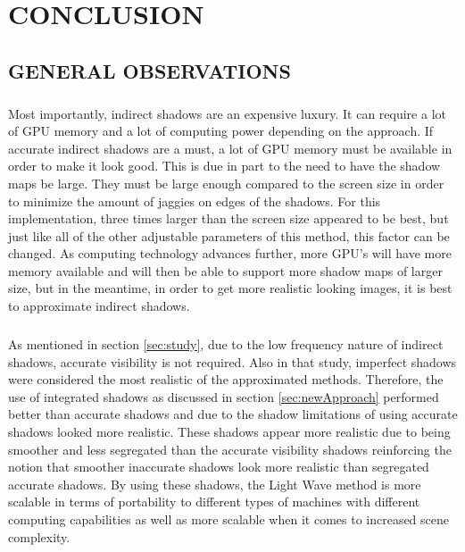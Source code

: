 \chapter{CONCLUSION}

\section{GENERAL OBSERVATIONS}
\paragraph{}
Most importantly, indirect shadows are an expensive luxury.  It can require a lot of GPU memory and a lot of computing power depending on the approach.  If accurate indirect shadows are a must, a lot of GPU memory must be available in order to make it look good.  This is due in part to the need to have the shadow maps be large.  They must be large enough compared to the screen size in order to minimize the amount of jaggies on edges of the shadows.  For this implementation, three times larger than the screen size appeared to be best, but just like all of the other adjustable parameters of this method, this factor can be changed.  As computing technology advances further, more GPU's will have more memory available and will then be able to support more shadow maps of larger size, but in the meantime, in order to get more realistic looking images, it is best to approximate indirect shadows.

\paragraph{}
As mentioned in section \ref{sec:study}, due to the low frequency nature of indirect shadows, accurate visibility is not required.  Also in that study, imperfect shadows were considered the most realistic of the approximated methods.  Therefore, the use of integrated shadows as discussed in section \ref{sec:newApproach} performed better than accurate shadows and due to the shadow limitations of using accurate shadows looked more realistic.  These shadows appear more realistic due to being smoother and less segregated than the accurate visibility shadows reinforcing the notion that smoother inaccurate shadows look more realistic than segregated accurate shadows.  By using these shadows, the Light Wave method is more scalable in terms of portability to different types of machines with different computing capabilities as well as more scalable when it comes to increased scene complexity.

